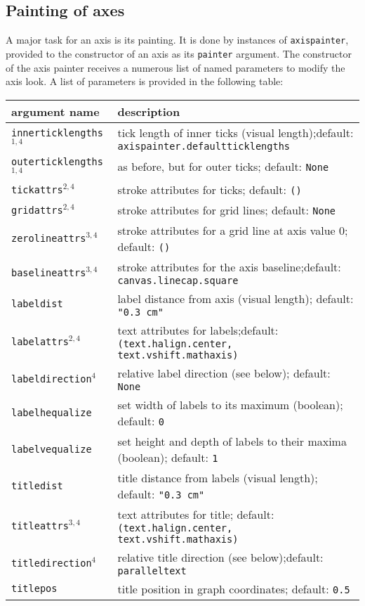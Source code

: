 \subsection{Painting of axes}

A major task for an axis is its painting. It is done by instances of
\verb|axispainter|, provided to the constructor of an axis as its
\verb|painter| argument. The constructor of the axis painter receives
a numerous list of named parameters to modify the axis look. A list of
parameters is provided in the following table:

\medskip
\begin{tabularx}{\linewidth}{l>{\raggedright\arraybackslash}X}
argument name&description\\
\hline
\texttt{innerticklengths}$^{1,4}$&tick length of inner ticks (visual length);\newline default: \texttt{axispainter.defaultticklengths}\\
\texttt{outerticklengths}$^{1,4}$&as before, but for outer ticks; default: \texttt{None}\\
\texttt{tickattrs}$^{2,4}$&stroke attributes for ticks; default: \texttt{()}\\
\texttt{gridattrs}$^{2,4}$&stroke attributes for grid lines; default: \texttt{None}\\
\texttt{zerolineattrs}$^{3,4}$&stroke attributes for a grid line at axis value 0; default: \texttt{()}\\
\texttt{baselineattrs}$^{3,4}$&stroke attributes for the axis baseline;\newline default: \texttt{canvas.linecap.square}\\
\texttt{labeldist}&label distance from axis (visual length); default: \texttt{"0.3 cm"}\\
\texttt{labelattrs}$^{2,4}$&text attributes for labels;\newline default: \texttt{(text.halign.center, text.vshift.mathaxis)}\\
\texttt{labeldirection}$^4$&relative label direction (see below); default: \texttt{None}\\
\texttt{labelhequalize}&set width of labels to its maximum (boolean); default: \texttt{0}\\
\texttt{labelvequalize}&set height and depth of labels to their maxima (boolean); default: \texttt{1}\\
\texttt{titledist}&title distance from labels (visual length); default: \texttt{"0.3 cm"}\\
\texttt{titleattrs}$^{3,4}$&text attributes for title; default: \texttt{(text.halign.center, text.vshift.mathaxis)}\\
\texttt{titledirection}$^4$&relative title direction (see below);\newline default: \texttt{paralleltext}\\
\texttt{titlepos}&title position in graph coordinates; default: \texttt{0.5}\\
\end{tabularx}
\medskip


